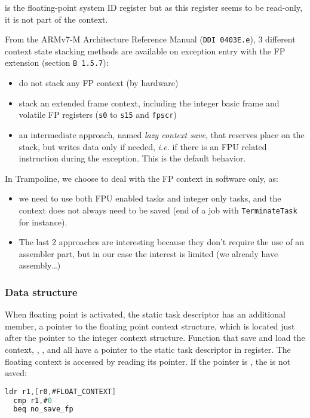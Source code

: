  is the floating-point system ID register but as this register seems to be read-only, it is not part of the context.

From the ARMv7-M Architecture Reference Manual (\texttt{DDI 0403E.e}), 3 different context state stacking methods are available on exception entry with the FP extension (section \texttt{B 1.5.7}):
\begin{itemize}
  \item do not stack any FP context (by hardware)
  \item stack an extended frame context, including the integer basic frame and volatile FP registers (\texttt{s0} to \texttt{s15} and \texttt{fpscr})
  \item an intermediate approach, named \textsl{lazy context save}, that reserves place on the stack, but writes data only if needed, \textsl{i.e.} if there is an FPU related instruction during the exception. This is the default behavior.
\end{itemize}

In Trampoline, we choose to deal with the FP context in software only, as:
\begin{itemize}
  \item we need to use both FPU enabled tasks and integer only tasks, and the context does not always need to be saved (end of a job with \texttt{TerminateTask} for instance). 
  \item The last 2 approaches are interesting because they don't require the use of an assembler part, but in our case the interest is limited (we already have assembly…)
\end{itemize}

\subsubsection{Data structure}

When floating point is activated, the static task descriptor has an additional member, a pointer to the floating point context structure, which is located just after the pointer to the integer context structure. Function that save and load the context, , ,  and  all have a pointer to the static task descriptor in  register. The floating context is accessed by reading its pointer. If the pointer is , the is not saved:

\begin{lstlisting}[language=C]
  ldr r1,[r0,#FLOAT_CONTEXT]
  cmp r1,#0
  beq no_save_fp
\end{lstlisting}

